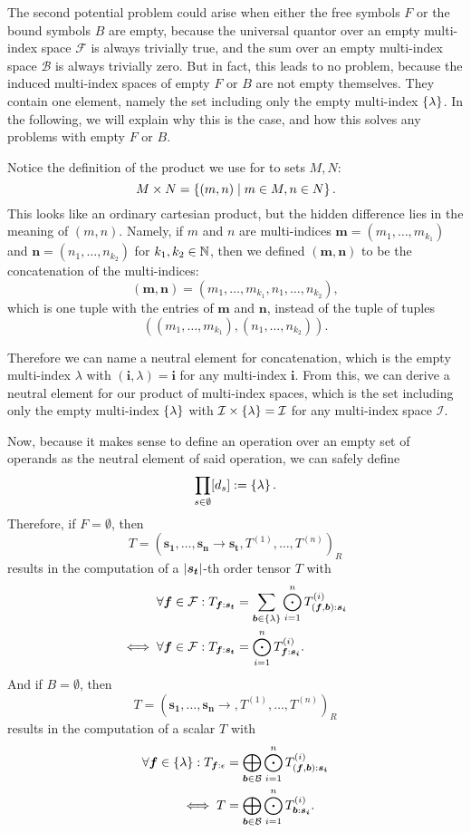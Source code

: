 The second potential problem could arise when either the free symbols $F$ or the bound symbols $B$ are empty,
because the universal quantor over an empty multi-index space $\mathcal{F}$ is always trivially true, and the sum over an empty multi-index space $\mathcal{B}$ is always trivially zero.
But in fact, this leads to no problem, because the induced multi-index spaces of empty $F$ or $B$ are not empty themselves.
They contain one element, namely the set including only the empty multi-index $\lbrace \lambda \rbrace$.
In the following, we will explain why this is the case, and how this solves any problems with empty $F$ or $B$.

Notice the definition of the product we use for to sets $M, N$:
$$M \times N = \left\lbrace (m, n) \mid m \in M, n \in N \right\rbrace.$$
This looks like an ordinary cartesian product, but the hidden difference lies in the meaning of $(m,n)$.
Namely, if $m$ and $n$ are multi-indices $\bm{m} = (m_1, \dots, m_{k_1})$ and $\bm{n} = (n_1, \dots, n_{k_2})$ for $k_1, k_2 \in \mathbb{N}$, then we defined $(\bm{m}, \bm{n})$ to be the concatenation of the multi-indices:
$$(\bm{m}, \bm{n}) = (m_1, \dots, m_{k_1}, n_1, \dots, n_{k_2}),$$
which is one tuple with the entries of $\bm{m}$ and $\bm{n}$, instead of the tuple of tuples
$$((m_1, \dots, m_{k_1}), (n_1, \dots, n_{k_2})).$$

Therefore we can name a neutral element for concatenation, which is the empty multi-index $\lambda$ with $(\bm{i}, \lambda) = \bm{i}$ for any multi-index $\bm{i}$.
From this, we can derive a neutral element for our product of multi-index spaces, which is the set including only the empty multi-index $\lbrace \lambda \rbrace$ with $\mathcal{I} \times \lbrace \lambda \rbrace = \mathcal{I}$ for any multi-index space $\mathcal{I}$.

Now, because it makes sense to define an operation over an empty set of operands as the neutral element of said operation, we can safely define
$$\prod\limits_{s \in \emptyset} [d_s] := \left\lbrace \lambda \right\rbrace.$$
Therefore, if $F = \emptyset$, then
$$T = (\bm{s_1},\dots,\bm{s_n} \rightarrow \bm{s_t}, T^{(1)},\dots,T^{(n)})_R$$
results in the computation of a $\left\lvert \bm{s_t} \right\rvert$-th order tensor $T$ with
\begin{align*}
    \forall \bm{f} \in \mathcal{F}: T_{\bm{f}: \bm{s_t}}      & = \sum\limits_{\bm{b} \in \lbrace \lambda \rbrace} \bigodot\limits_{i = 1}^{n} T^{(i)}_{(\bm{f},\bm{b}):\bm{s_i}} \\
    \iff \forall \bm{f} \in \mathcal{F}: T_{\bm{f}: \bm{s_t}} & = \bigodot\limits_{i = 1}^{n} T^{(i)}_{\bm{f}:\bm{s_i}}.
\end{align*}
And if $B = \emptyset$, then
$$T = (\bm{s_1},\dots,\bm{s_n} \rightarrow , T^{(1)},\dots,T^{(n)})_R$$
results in the computation of a scalar $T$ with
\begin{align*}
    \forall \bm{f} \in \lbrace \lambda \rbrace: T_{\bm{f}: \epsilon} & = \bigoplus\limits_{\bm{b} \in \mathcal{B}} \bigodot\limits_{i = 1}^{n} T^{(i)}_{(\bm{f},\bm{b}):\bm{s_i}} \\
    \iff T                                                      & = \bigoplus\limits_{\bm{b} \in \mathcal{B}} \bigodot\limits_{i = 1}^{n} T^{(i)}_{\bm{b}:\bm{s_i}}.
\end{align*}

